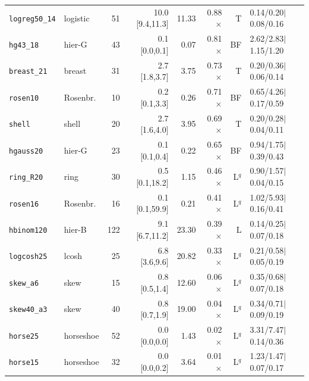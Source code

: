 {\begin{longtable}{llrrrrrl}
\texttt{logreg50\_14} & logistic & 51 & 10.0 [9.4,11.3] & 11.33 & 0.88$\times$ & T & 0.14/0.20$\mid$0.08/0.16\\
\texttt{hg43\_18} & hier-G & 43 & 0.1 [0.0,0.1] & 0.07 & 0.81$\times$ & BF & 2.62/2.83$\mid$1.15/1.20\\
\texttt{breast\_21} & breast & 31 & 2.7 [1.8,3.7] & 3.75 & 0.73$\times$ & T & 0.20/0.36$\mid$0.06/0.14\\
\texttt{rosen10} & Rosenbr. & 10 & 0.2 [0.1,3.3] & 0.26 & 0.71$\times$ & BF & 0.65/4.26$\mid$0.17/0.59\\
\texttt{shell} & shell & 20 & 2.7 [1.6,4.0] & 3.95 & 0.69$\times$ & T & 0.20/0.28$\mid$0.04/0.11\\
\texttt{hgauss20} & hier-G & 23 & 0.1 [0.1,0.4] & 0.22 & 0.65$\times$ & BF & 0.94/1.75$\mid$0.39/0.43\\
\texttt{ring\_R20} & ring & 30 & 0.5 [0.1,18.2] & 1.15 & 0.46$\times$ & L$^q$ & 0.90/1.57$\mid$0.04/0.15\\
\texttt{rosen16} & Rosenbr. & 16 & 0.1 [0.1,59.9] & 0.21 & 0.41$\times$ & L$^q$ & 1.02/5.93$\mid$0.16/0.41\\
\texttt{hbinom120} & hier-B & 122 & 9.1 [6.7,11.2] & 23.30 & 0.39$\times$ & L & 0.14/0.25$\mid$0.07/0.18\\
\texttt{logcosh25} & lcosh & 25 & 6.8 [3.6,9.6] & 20.82 & 0.33$\times$ & L$^q$ & 0.21/0.58$\mid$0.05/0.19\\
\texttt{skew\_a6} & skew & 15 & 0.8 [0.5,1.4] & 12.60 & 0.06$\times$ & L$^q$ & 0.35/0.68$\mid$0.07/0.18\\
\texttt{skew40\_a3} & skew & 40 & 0.8 [0.7,1.9] & 19.00 & 0.04$\times$ & L$^q$ & 0.34/0.71$\mid$0.09/0.19\\
\texttt{horse25} & horseshoe & 52 & 0.0 [0.0,0.0] & 1.43 & 0.02$\times$ & L$^q$ & 3.31/7.47$\mid$0.14/0.36\\
\texttt{horse15} & horseshoe & 32 & 0.0 [0.0,0.2] & 3.64 & 0.01$\times$ & L$^q$ & 1.23/1.47$\mid$0.07/0.17\\
\bottomrule
\end{longtable}}
